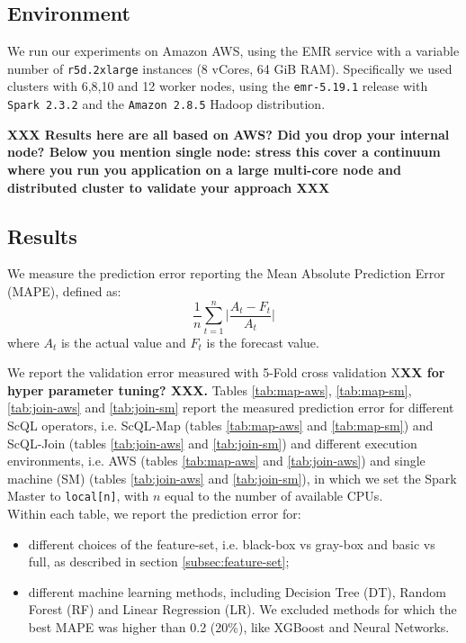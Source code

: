 \documentclass[a4paper, 10pt, conference]{ieeeconf}      %
\begin{document}
\subsection{Environment}
We run our experiments on Amazon AWS, using the EMR service with a variable number of \texttt{r5d.2xlarge} instances (8 vCores, 64 GiB RAM). Specifically we used clusters with 6,8,10 and 12 worker nodes, using the \texttt{emr-5.19.1} release with \texttt{Spark 2.3.2} and the \texttt{Amazon 2.8.5} Hadoop distribution.

\textbf{XXX Results here are all based on AWS?  Did you drop your internal node?  Below you mention single node:  stress this cover a continuum where you run you application on a large multi-core node and distributed cluster to validate your approach   XXX}

\subsection{Results}
We measure the prediction error reporting the Mean Absolute Prediction Error (MAPE), defined as:
$$ \frac{1}{n} \sum_{t=1}^n \bigg| \frac{A_t - F_t}{A_t}\bigg|$$
where $A_t$ is the actual value and $F_t$ is the forecast value.

We report the validation error measured with 5-Fold cross validation X\textbf{XX for hyper parameter tuning?  XXX.}
Tables \ref{tab:map-aws}, \ref{tab:map-sm},  \ref{tab:join-aws} and \ref{tab:join-sm} report the measured prediction error for different ScQL operators, i.e. ScQL-Map (tables \ref{tab:map-aws} and \ref{tab:map-sm}) and ScQL-Join (tables \ref{tab:join-aws} and \ref{tab:join-sm}) and different execution environments, i.e. AWS (tables \ref{tab:map-aws} and \ref{tab:join-aws}) and single machine (SM) (tables \ref{tab:join-aws} and \ref{tab:join-sm}), in which we set the Spark Master to \texttt{local[n]}, with $n$ equal to the number of available CPUs. \\
Within each table, we report the prediction error for:
\begin{itemize}
    \item different choices of the feature-set, i.e. black-box vs gray-box and basic vs full, as described in section \ref{subsec:feature-set};
    \item different machine learning methods, including Decision Tree (DT), Random Forest (RF) and Linear Regression (LR). We excluded methods for which the best MAPE was higher than 0.2 (20\%), like XGBoost and Neural Networks.
\end{itemize}
\end{document}

